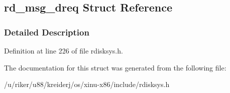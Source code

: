 \hypertarget{structrd__msg__dreq}{}\subsection{rd\+\_\+msg\+\_\+dreq Struct Reference}
\label{structrd__msg__dreq}


\subsubsection{Detailed Description}


Definition at line 226 of file rdisksys.\+h.



The documentation for this struct was generated from the following file\+:\begin{DoxyCompactItemize}
\item 
/u/riker/u88/kreiderj/os/xinu-\/x86/include/rdisksys.\+h\end{DoxyCompactItemize}
